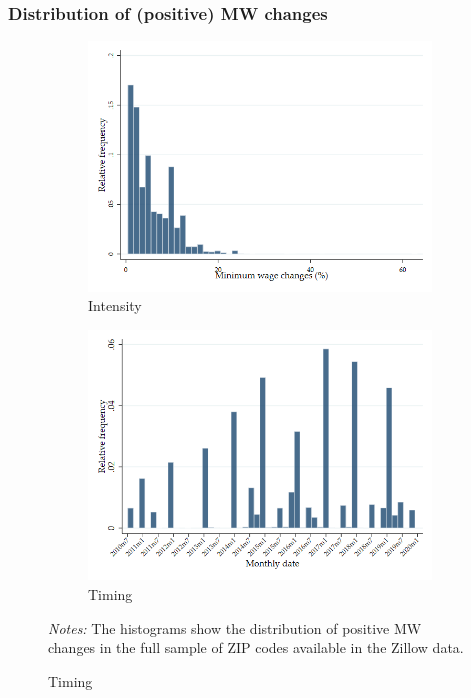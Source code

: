 \documentclass[aspectratio=169, t]{beamer}
\begin{document}
\begin{frame}[label=dist_mw_changes]
	\frametitle{Distribution of (positive) MW changes}
	
	\begin{figure}[h!]	\centering
		\begin{subfigure}{.49\textwidth}
			\caption{Intensity}
			\includegraphics[width = .91\textwidth]
			{describe_estimation_samples/output/pct_ch_mw_dist.png}
		\end{subfigure}%
		\begin{subfigure}{.49\textwidth}
			\caption{Timing}
			\includegraphics[width = .91\textwidth]
			{describe_estimation_samples/output/pct_ch_mw_date_dist.png}
		\end{subfigure}
		\begin{minipage}{.95\textwidth} \scriptsize \vspace{1mm}
			\textit{Notes:} The histograms show the distribution of positive MW changes 
			in the full sample of ZIP codes available in the Zillow data.
		\end{minipage}
	\end{figure}
	
	\hyperlink{stat_MW}{}
\end{frame}
\end{document}
